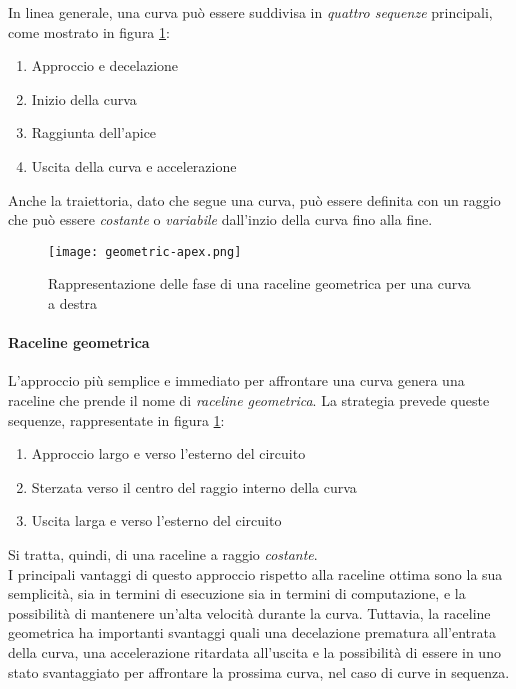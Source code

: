 In linea generale, una curva può essere suddivisa in \textit{quattro sequenze} principali, come mostrato
in figura \ref{fig:geom-raceline}:
\begin{enumerate}
	\item Approccio e decelazione
	\item Inizio della curva
	\item Raggiunta dell'apice
	\item Uscita della curva e accelerazione
\end{enumerate}

Anche la traiettoria, dato che segue una curva, può essere definita con un raggio che può essere
\textit{costante} o \textit{variabile} dall'inzio della curva fino alla fine.

\begin{figure}[H]
	\begin{center}
		\texttt{[image: geometric-apex.png]}
	\end{center}
	\caption{Rappresentazione delle fase di una raceline geometrica per una curva a destra \cite{drivingfast}}
	\label{fig:geom-raceline}
\end{figure}

\paragraph{Raceline geometrica}
L'approccio più semplice e immediato per affrontare una curva genera una raceline che prende il
nome di \textit{raceline geometrica}. La strategia prevede queste sequenze, rappresentate in figura
\ref{fig:geom-raceline}:
\begin{enumerate}
	\item Approccio largo e verso l'esterno del circuito
	\item Sterzata verso il centro del raggio interno della curva
	\item Uscita larga e verso l'esterno del circuito
\end{enumerate}
Si tratta, quindi, di una raceline a raggio \textit{costante}.\\
I principali vantaggi di questo approccio rispetto alla raceline ottima sono la sua semplicità, sia in
termini di esecuzione sia in termini di computazione, e la possibilità di mantenere un'alta velocità
durante la curva. Tuttavia, la raceline geometrica ha importanti svantaggi quali una decelazione
prematura all'entrata della curva, una accelerazione ritardata all'uscita e la possibilità di essere in
uno stato svantaggiato per affrontare la prossima curva, nel caso di curve in sequenza.

